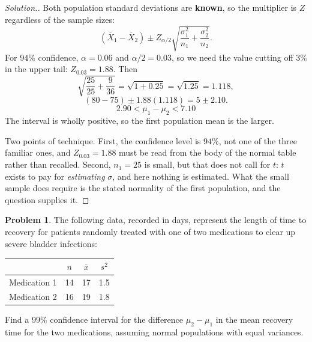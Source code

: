 \documentclass[11pt,a4paper]{article}
\theoremstyle{definition}
\newtheorem{problemx}{Problem}[section]
\newenvironment{problem}{\begin{problemx}}{\end{problemx}}
\newenvironment{solution}
  {\renewcommand{\qedsymbol}{}\begin{proof}[\textit{Solution}.]}
  {\end{proof}}
\begin{document}
\begin{solution}
Both population standard deviations are \textbf{known}, so the multiplier is $Z$ regardless
of the sample sizes:
\[(\overline{X}_1-\overline{X}_2)\pm Z_{\alpha/2}
\sqrt{\frac{\sigma_1^2}{n_1}+\frac{\sigma_2^2}{n_2}}.\]
For $94\%$ confidence, $\alpha=0.06$ and $\alpha/2=0.03$, so we need the value cutting off
$3\%$ in the upper tail: $Z_{0.03}=1.88$. Then
\[\sqrt{\frac{25}{25}+\frac{9}{36}}=\sqrt{1+0.25}=\sqrt{1.25}=1.118,\]
\[(80-75)\pm 1.88(1.118)=5\pm 2.10.\]
\[2.90<\mu_1-\mu_2<7.10\]
The interval is wholly positive, so the first population mean is the larger.

Two points of technique. First, the confidence level is $94\%$, not one of the three
familiar ones, and $Z_{0.03}=1.88$ must be read from the body of the normal table rather
than recalled. Second, $n_1=25$ is small, but that does not call for $t$: $t$ exists to pay
for \emph{estimating} $\sigma$, and here nothing is estimated. What the small sample does
require is the stated normality of the first population, and the question supplies it.
\end{solution}

\begin{problem}
The following data, recorded in days, represent the length of time to recovery for patients
randomly treated with one of two medications to clear up severe bladder infections:
\begin{table}[H]
\centering
\begin{tabular}{l|ccc}
& $n$ & $\overline{x}$ & $s^2$\\
\hline
Medication 1 & 14 & 17 & 1.5\\
Medication 2 & 16 & 19 & 1.8\\
\end{tabular}
\end{table}
Find a $99\%$ confidence interval for the difference $\mu_2-\mu_1$ in the mean recovery time
for the two medications, assuming normal populations with equal variances.
\end{problem}
\end{document}
